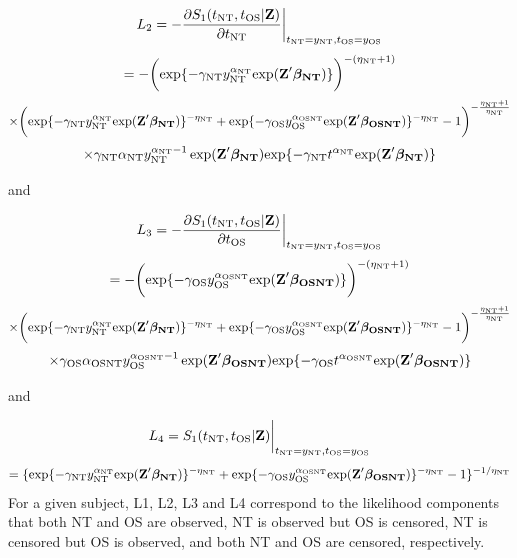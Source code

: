 \documentclass[12pt]{article}
\begin{document}
$$
L_2=-\frac{\partial S_1(t_{\rm NT}, t_{\rm OS}|\textbf{Z})}{\partial t_{\rm NT}}\bigg|_{t_{\rm NT}=y_{\rm NT},t_{\rm OS}=y_{\rm OS}}
$$
$$
=-\bigg(\mathrm{exp}\{-\gamma_{\rm NT} y_{\rm NT}^{\alpha_{\rm NT}}
\mathrm{exp}(\textbf{Z}' \boldsymbol{\beta_{\rm NT}} )\}\bigg)^{-(\eta_{\rm NT}+1)}
$$
$$
\times \bigg(\mathrm{exp}\{-\gamma_{\rm NT} y_{\rm NT}^{\alpha_{\rm NT}}
\mathrm{exp}(\textbf{Z}' \boldsymbol{\beta_{\rm NT}} )\}^{-\eta_{\rm NT}}+\mathrm{exp}\{-\gamma_{\rm OS} y_{\rm OS}^{\alpha_{\rm OSNT}}
\mathrm{exp}(\textbf{Z}' \boldsymbol{\beta_{\rm OSNT}} )\}^{-\eta_{\rm NT}}-1\bigg)^{-\frac{\eta_{\rm NT}+1}{\eta_{\rm NT}}}
$$
$$
\times \gamma_{\rm NT} \alpha_{\rm NT} y_{\rm NT}^{{\alpha_{\rm NT} -1}} \exp(\textbf{Z}' \boldsymbol{\beta_{\rm NT}}) \mathrm{exp}\{-\gamma_{\rm NT} t^{\alpha_{\rm NT}}
\mathrm{exp}(\textbf{Z}' \boldsymbol{\beta_{\rm NT}} )\}
$$

and

$$
L_3=-\frac{\partial S_1(t_{\rm NT}, t_{\rm OS}|\textbf{Z})}{\partial t_{\rm OS}}\bigg|_{t_{\rm NT}=y_{\rm NT},t_{\rm OS}=y_{\rm OS}}
$$
$$
=-\bigg(\mathrm{exp}\{-\gamma_{\rm OS} y_{\rm OS}^{\alpha_{\rm OSNT}}
\mathrm{exp}(\textbf{Z}' \boldsymbol{\beta_{\rm OSNT}} )\}\bigg)^{-(\eta_{\rm NT}+1)}
$$
$$
\times \bigg(\mathrm{exp}\{-\gamma_{\rm NT} y_{\rm NT}^{\alpha_{\rm NT}}
\mathrm{exp}(\textbf{Z}' \boldsymbol{\beta_{\rm NT}} )\}^{-\eta_{\rm NT}}+\mathrm{exp}\{-\gamma_{\rm OS} y_{\rm OS}^{\alpha_{\rm OSNT}}
\mathrm{exp}(\textbf{Z}' \boldsymbol{\beta_{\rm OSNT}} )\}^{-\eta_{\rm NT}}-1\bigg)^{-\frac{\eta_{\rm NT}+1}{\eta_{\rm NT}}}
$$
$$
\times \gamma_{\rm OS} \alpha_{\rm OSNT} y_{\rm OS}^{{\alpha_{\rm OSNT} -1}} \exp(\textbf{Z}' \boldsymbol{\beta_{\rm OSNT}}) \mathrm{exp}\{-\gamma_{\rm OS} t^{\alpha_{\rm OSNT}}
\mathrm{exp}(\textbf{Z}' \boldsymbol{\beta_{\rm OSNT}} )\}
$$

and

$$
L_4=S_1(t_{\rm NT}, t_{\rm OS}|\textbf{Z})\bigg|_{t_{\rm NT}=y_{\rm NT},t_{\rm OS}=y_{\rm OS}}
$$
$$
=\{\mathrm{exp}\{-\gamma_{\rm NT} y_{\rm NT}^{\alpha_{\rm NT}}
\mathrm{exp}(\textbf{Z}' \boldsymbol{\beta_{\rm NT}} )\}^{-\eta_{\rm NT}}
+\mathrm{exp}\{-\gamma_{\rm OS} y_{\rm OS}^{\alpha_{\rm OSNT}}
\mathrm{exp}(\textbf{Z}' \boldsymbol{\beta_{\rm OSNT}} )\}^{-\eta_{\rm NT}}-1\}^{-1/\eta_{\rm NT}}
$$
For a given subject, L1, L2, L3 and L4 correspond to the likelihood components that both NT and OS are observed, NT is observed but OS is censored, NT is censored but OS is observed, and both NT and OS are censored, respectively.
\end{document}
